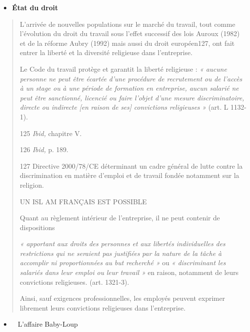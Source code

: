 \begin{itemize}
\item
  \textbf{État du droit}
\end{itemize}

\begin{quote}
L'arrivée de nouvelles populations sur le marché du travail, tout comme
l'évolution du droit du travail sous l'effet successif des lois Auroux
(1982) et de la réforme Aubry (1992) mais aussi du droit européen127,
ont fait entrer la liberté et la diversité religieuse dans l'entreprise.

Le Code du travail protège et garantit la liberté religieuse : \emph{«
aucune personne ne peut être écartée d'une procédure de recrutement ou
de l'accès à un stage ou à une période de formation en entreprise, aucun
salarié ne peut être sanctionné, licencié ou faire l'objet d'une mesure
discriminatoire, directe ou indirecte {[}en raison de ses{]} convictions
religieuses »} (art. L 1132-1).

125 \emph{Ibid,} chapitre V.

126 \emph{Ibid,} p. 189.

127 Directive 2000/78/CE déterminant un cadre général de lutte contre la
discrimination en matière d'emploi et de travail fondée notamment sur la
religion.

UN ISL AM FRANÇAIS EST POSSIBLE

Quant au règlement intérieur de l'entreprise, il ne peut contenir de
dispositions

\emph{« apportant aux droits des personnes et aux libertés individuelles
des restrictions qui ne seraient pas justifiées par la nature de la
tâche à accomplir ni proportionnées au but recherché »} ou \emph{«
discriminant les salariés dans leur emploi ou leur travail »} en raison,
notamment de leurs convictions religieuses. (art. 1321-3).

Ainsi, sauf exigences professionnelles, les employés peuvent exprimer
librement leurs convictions religieuses dans l'entreprise.
\end{quote}

\begin{itemize}
\item ~
  L'affaire Baby-Loup
\end{itemize}


